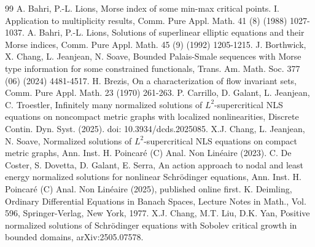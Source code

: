 \documentclass[10pt,a4paper]{article}
\theoremstyle{definition} \theoremstyle{remark}
\numberwithin{equation}{section}
\begin{document}
\begin{thebibliography}{99}
	  A. Bahri, P.-L. Lions, Morse index of some min-max critical points. I. Application to multiplicity results, Comm. Pure Appl. Math. 41 (8) (1988) 1027-1037.
	  A. Bahri, P.-L. Lions, Solutions of superlinear elliptic equations and their Morse indices, Comm. Pure Appl. Math. 45 (9) (1992) 1205-1215.
	  J. Borthwick, X. Chang, L. Jeanjean, N. Soave, Bounded Palais-Smale sequences with Morse type information for some constrained functionals, Trans. Am. Math. Soc. 377 (06) (2024) 4481-4517.
	  H. Brezis, On a characterization of flow invariant sets, Comm. Pure Appl. Math. 23 (1970) 261-263.
	  P. Carrillo, D. Galant, L. Jeanjean, C. Troestler, Infinitely many normalized solutions of $L^2$-supercritical NLS equations on noncompact metric graphs with localized nonlinearities, Discrete Contin. Dyn. Syst. (2025). doi: 10.3934/dcds.2025085.
	 X.J. Chang, L. Jeanjean, N. Soave, Normalized solutions of $L^2$-supercritical NLS equations on compact metric graphs, Ann. Inst. H. Poincar\'e (C) Anal. Non Lin\'eaire (2023).
	  C. De Coster, S. Dovetta, D. Galant, E. Serra, An action approach to nodal and least energy normalized solutions for nonlinear Schr\"odinger equations, Ann. Inst. H. Poincar\'e (C) Anal. Non Lin\'eaire (2025), published online first.
	  K. Deimling, Ordinary Differential Equations in Banach Spaces, Lecture Notes in Math., Vol. 596, Springer-Verlag, New York, 1977.
	  X.J. Chang, M.T. Liu, D.K. Yan, Positive normalized solutions of Schr\"odinger equations with Sobolev critical growth in bounded domains, arXiv:2505.07578.

\end{thebibliography}
\end{document}
